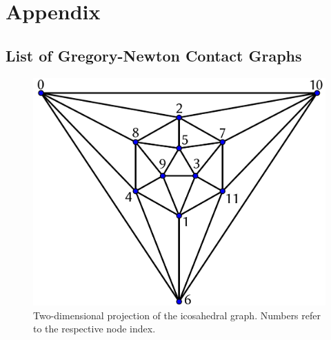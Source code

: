 
\part{Appendix}
\label{sec:appendix}

\begin{appendix}

\chapter{List of Gregory-Newton Contact Graphs}
\label{sec:listofgregorynewtonshells}

\begin{figure}[h]\centering
\includegraphics[width=.8\textwidth]{gregory-newton/ico.pdf}
    \caption{Two-dimensional projection of the icosahedral graph. Numbers refer
        to the respective node index.}
    \label{fig:icographappendix}
\end{figure}



\end{appendix}
